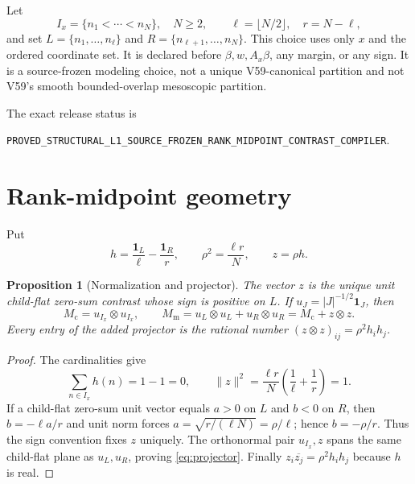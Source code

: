 \documentclass[10pt]{article}
\newtheorem{proposition}[theorem]{Proposition}
\newcommand{\conj}[1]{\overline{#1}}
\newcommand{\one}{\mathbf 1}
\newcommand{\Mc}{M_{\mathrm c}}
\newcommand{\Mm}{M_{\mathrm m}}
\begin{document}
Let
\begin{equation}
 I_x=\{n_1<\cdots<n_N\},\quad N\geq2,\qquad
 \ell=\lfloor N/2\rfloor,\quad r=N-\ell,               \label{eq:ranks}
\end{equation}
and set $L=\{n_1,\ldots,n_\ell\}$ and
$R=\{n_{\ell+1},\ldots,n_N\}$.  This choice uses only $x$ and the ordered
coordinate set.  It is declared before $\beta,w,A_x\beta$, any margin, or any
sign.  It is a source-frozen modeling choice, not a unique V59-canonical
partition and not V59's smooth bounded-overlap mesoscopic partition.

The exact release status is
\begin{center}
\small\nolinkurl{PROVED_STRUCTURAL_L1_SOURCE_FROZEN_RANK_MIDPOINT_CONTRAST_COMPILER}.
\end{center}

\section{Rank-midpoint geometry}

Put
\begin{equation}
 h=\frac{\one_L}{\ell}-\frac{\one_R}{r},\qquad
 \rho^2=\frac{\ell r}{N},\qquad z=\rho h.              \label{eq:contrast}
\end{equation}

\begin{proposition}[Normalization and projector]\label{prop:projector}
The vector $z$ is the unique unit child-flat zero-sum contrast whose sign is
positive on $L$.  If $u_J=|J|^{-1/2}\one_J$, then
\begin{equation}
 \Mc=u_{I_x}\otimes u_{I_x},\qquad
 \Mm=u_L\otimes u_L+u_R\otimes u_R
      =\Mc+z\otimes z.                                 \label{eq:projector}
\end{equation}
Every entry of the added projector is the rational number
$(z\otimes z)_{ij}=\rho^2h_i h_j$.
\end{proposition}

\begin{proof}
The cardinalities give
\[
 \sum_{n\in I_x}h(n)=1-1=0,
 \qquad
 \|z\|^2=\frac{\ell r}{N}\left(\frac1\ell+\frac1r\right)=1.
\]
If a child-flat zero-sum unit vector equals $a>0$ on $L$ and $b<0$ on $R$,
then $b=-\ell a/r$ and unit norm forces
$a=\sqrt{r/(\ell N)}=\rho/\ell$; hence $b=-\rho/r$.
Thus the sign convention fixes $z$ uniquely.  The orthonormal pair
$u_{I_x},z$ spans the same child-flat plane as $u_L,u_R$, proving
\eqref{eq:projector}.  Finally $z_i\conj{z_j}=\rho^2h_i h_j$ because $h$ is
real.
\end{proof}
\end{document}
